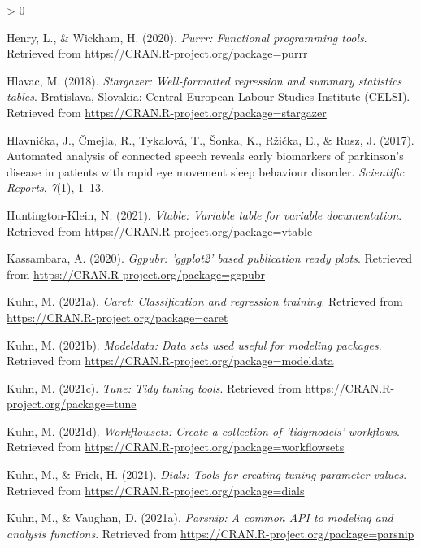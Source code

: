 \documentclass[
  english,
  doc,floatsintext]{apa6}
\newlength{\cslhangindent}
\newenvironment{CSLReferences}[2] %
 {%
  \setlength{\parindent}{0pt}
  \ifodd #1 \everypar{\setlength{\hangindent}{\cslhangindent}}\ignorespaces\fi
  \ifnum #2 > 0
  \setlength{\parskip}{#2\baselineskip}
  \fi
 }%
 {}
\begin{document}
\begin{CSLReferences}{1}{0}
\leavevmode\hypertarget{ref-R-purrr}{}%
Henry, L., \& Wickham, H. (2020). \emph{Purrr: Functional programming tools}. Retrieved from \url{https://CRAN.R-project.org/package=purrr}

\leavevmode\hypertarget{ref-R-stargazer}{}%
Hlavac, M. (2018). \emph{Stargazer: Well-formatted regression and summary statistics tables}. Bratislava, Slovakia: Central European Labour Studies Institute (CELSI). Retrieved from \url{https://CRAN.R-project.org/package=stargazer}

\leavevmode\hypertarget{ref-hlavnivcka2017automated}{}%
Hlavnička, J., Čmejla, R., Tykalová, T., Šonka, K., Ržička, E., \& Rusz, J. (2017). Automated analysis of connected speech reveals early biomarkers of parkinson's disease in patients with rapid eye movement sleep behaviour disorder. \emph{Scientific Reports}, \emph{7}(1), 1--13.

\leavevmode\hypertarget{ref-R-vtable}{}%
Huntington-Klein, N. (2021). \emph{Vtable: Variable table for variable documentation}. Retrieved from \url{https://CRAN.R-project.org/package=vtable}

\leavevmode\hypertarget{ref-R-ggpubr}{}%
Kassambara, A. (2020). \emph{Ggpubr: 'ggplot2' based publication ready plots}. Retrieved from \url{https://CRAN.R-project.org/package=ggpubr}

\leavevmode\hypertarget{ref-R-caret}{}%
Kuhn, M. (2021a). \emph{Caret: Classification and regression training}. Retrieved from \url{https://CRAN.R-project.org/package=caret}

\leavevmode\hypertarget{ref-R-modeldata}{}%
Kuhn, M. (2021b). \emph{Modeldata: Data sets used useful for modeling packages}. Retrieved from \url{https://CRAN.R-project.org/package=modeldata}

\leavevmode\hypertarget{ref-R-tune}{}%
Kuhn, M. (2021c). \emph{Tune: Tidy tuning tools}. Retrieved from \url{https://CRAN.R-project.org/package=tune}

\leavevmode\hypertarget{ref-R-workflowsets}{}%
Kuhn, M. (2021d). \emph{Workflowsets: Create a collection of 'tidymodels' workflows}. Retrieved from \url{https://CRAN.R-project.org/package=workflowsets}

\leavevmode\hypertarget{ref-R-dials}{}%
Kuhn, M., \& Frick, H. (2021). \emph{Dials: Tools for creating tuning parameter values}. Retrieved from \url{https://CRAN.R-project.org/package=dials}

\leavevmode\hypertarget{ref-R-parsnip}{}%
Kuhn, M., \& Vaughan, D. (2021a). \emph{Parsnip: A common API to modeling and analysis functions}. Retrieved from \url{https://CRAN.R-project.org/package=parsnip}


\end{CSLReferences}
\end{document}
